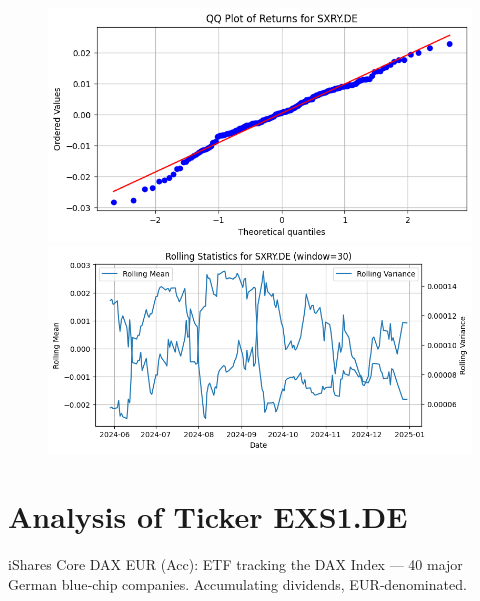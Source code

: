 \documentclass{article}%
\begin{document}
%


\begin{figure}[htbp]%
\begin{minipage}{0.48\textwidth}%
\includegraphics[width=\linewidth]{ticker_images/SXRY.DE_qq_plot.png}%
\end{minipage}%
\begin{minipage}{0.48\textwidth}%
\includegraphics[width=\linewidth]{ticker_images/SXRY.DE_rolling_stats.png}%
\end{minipage}%
\end{figure}

%
\section*{Analysis of Ticker EXS1.DE}%
\label{sec:AnalysisofTickerEXS1.DE}%
iShares Core DAX EUR (Acc): ETF tracking the DAX Index — 40 major German blue‑chip companies. Accumulating dividends, EUR‑denominated.%
\end{document}
